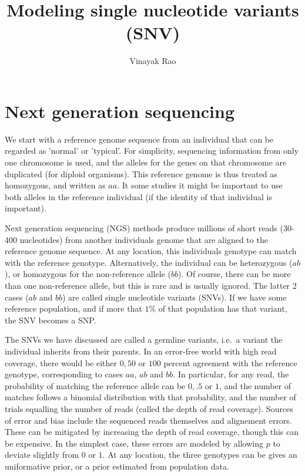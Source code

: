 \documentclass[10pt]{article}
\title{Modeling single nucleotide variants (SNV)}
\author{Vinayak Rao}
\begin{document}
\maketitle

\section{Next generation sequencing}
We start with a reference genome sequence from an individual that can be regarded as 'normal' or 'typical'.
For simplicity, sequencing information from only one chromosome is used, and the alleles for the genes on that chromosome are
duplicated (for diploid organisms). This reference genome is thus treated as homozygous, and written as $aa$.
It some studies it might be important to use both alleles in the reference individual (if the identity of that individual is important).

Next generation sequencing (NGS) methods produce millions of short reads (30-400 nucleotides) from another individuals genome that are aligned to the 
reference genome sequence. At any location, this individuals genotype can match with the reference genotype. Alternatively, the
individual can be heterozygous ($ab$), or homozygous for the non-reference allele ($bb$). Of course, there can be more than one
non-reference allele, but this is rare and is usually ignored. The latter 2 cases ($ab$ and $bb$) are called single nucleotide
variants (SNVs). If we have some reference population, and if more that $1\%$ of that population has that variant, the SNV becomes a SNP. 

The SNVs we have discussed are called a germline variants, i.e.\ a variant the individual inherits from
their parents. In an error-free world with high read coverage, there would be either $0, 50$ or $100$ percent agreement with
the reference genotype, corresponding to cases $aa$, $ab$ and $bb$. In particular, for any read, the probability of matching the reference
allele can be $0, .5$ or $1$, and the number of matches follows a binomial distribution with that probability, and the number of trials equalling
the number of reads (called the depth of read coverage). Sources of error and bias include the sequenced reads themselves
and alignement errors. These can be mitigated by increasing the depth of read coverage, though this can be expensive. In the
simplest case, these errors are modeled by allowing $p$ to deviate slightly from $0$ or $1$. At any location, the three
genotypes can be gives an uniformative prior, or a prior estimated from population data.
\end{document}
